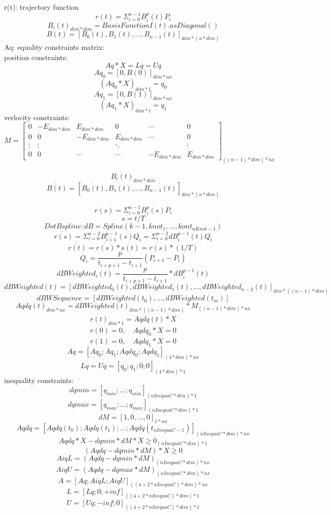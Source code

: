 \documentclass[]{article}
\begin{document}
    r(t): trajectory function \\
    \[ r(t) = \Sigma_{i = 0}^{n - 1}B_{i}^{p}(t)P_{i} \]
    \[B_{i}(t)_{dim * dim} =  BasisFunctionI(t).asDiagonal()\]
    \[B(t) = [B_{0}(t), B_{1}(t), \ldots, B_{n - 1}(t)]_{dim * (n * dim)} \]
    Aq: equality constraints matrix: \\
    position constraints:\\
    \[Aq * X = Lq = Uq \]
    \[ Aq_{0} = [0, B(0)]_{dim * nx} \]
    \[ (Aq_{0} * X)_{dim * 1} = q_{0} \]
    \[ Aq_{1} = [0, B(1)]_{dim * nx} \]
    \[ (Aq_{1} * X)_{dim * 1} = q_{1} \]
    verlocity constraints:\\
    \[ M = \begin{bmatrix}
        0 & -E_{dim * dim} & E_{dim * dim} & 0 & \cdots & 0 \\
        0 & 0 & -E_{dim * dim} & E_{dim * dim} & \cdots & 0 \\
        \vdots &  \vdots & & \ddots & & \vdots \\
        0 & 0 & \cdots &\cdots &-E_{dim * dim} & E_{dim * dim}
    \end{bmatrix}_{((n - 1) * dim) * nx} \]

    \[ \dot{B_i(t)}_{dim * dim}\]
    \[ \dot{B(t)} =  [\dot{B_{0}(t)}, \dot{B_{1}(t)}, \ldots, \dot{B_{n - 1}(t)}]_{dim * (n * dim)} \]
    
    \[ r(s) = \Sigma_{i = 0}^{n - 1}B_{i}^{p}(s)P_{i} \]
    \[ s = t/T \]
    \[ DotBspline: dB = Spline(k - 1, {knot_1,\dots, kont_{nKnot - 1}}) \]
    \[ \dot{r(s)} = \Sigma_{i = 0}^{n - 2}B_{i + 1}^{p - 1}(s)Q_{i} = \Sigma_{i = 0}^{n - 2}dB_{i}^{p - 1}(t)Q_{i} \]
    \[ \dot{r(t)} = \dot{r(s)} * \dot{s(t)} = \dot{r(s)} * (1/T) \]
    \[ Q_{i} = \frac{p}{t_{i + p + 1} - t_{i + 1}}(P_{i + 1} - P_{i}) \]
    \[ dBWeighted_{i}(t) = \frac{p}{t_{i + p + 1} - t_{i + 1}} * dB_{i}^{p - 1}(t) \]
    \[ dBWeighted(t) =  [dBWeighted_{0}(t), dBWeighted_{1}(t), \ldots, dBWeighted_{n - 2}(t)]_{dim * ((n - 1) * dim)} \]
    \[ dBWSequence = [dBWeighted(t_0), \dots, dBWeighted(t_m)] \]
    \[ Aqdq(t)_{dim * nx} = dBWeighted(t)_{dim * ((n - 1) * dim)} * M_{((n - 1) * dim) * nx} \]
    \[ \dot{r(t)}_{dim * 1} = Aqdq(t) * X \]
    \[ \dot{r(0)} = 0,\quad Aqdq_{0} * X = 0 \]
    \[ \dot{r(1)} = 0,\quad Aqdq_{1} * X = 0 \]
    \[ Aq = [Aq_{0}; Aq_{1}; Aqdq_{0}; Aqdq_{1}]_{(4 * dim) * nx} \]
    \[ Lq = Uq = [q_{0}; q_{1}; 0; 0]_{(4 * dim) * 1} \]
    inequality constraints: \\
    \[ dqmin = [\dot{q_{min}}; \ldots; \dot{q_{min}}]_{(nInequaC * dim) * 1} \]
    \[ dqmax = [\dot{q_{max}}; \ldots; \dot{q_{max}}]_{(nInequaC * dim) * 1} \]
    \[ dM = [1, 0, \ldots, 0]_{1 * nx} \]
    \[ Aqdq = [Aqdq(t_{0}); Aqdq(t_{1}); \ldots; Aqdq(t_{nInequaC - 1})]_{(nInequaC * dim) * nx} \]
    \[ Aqdq * X - dqmin * dM * X \geq 0_{(nInequaC * dim)*1} \]
    \[ (Aqdq - dqmin * dM) * X \geq 0 \]
    \[ AiqL = (Aqdq - dqmin * dM)_{(nInequaC * dim) * nx} \]
    \[ AiqU = (Aqdq - dqmax * dM)_{(nInequaC * dim) * nx} \]
    \[ A = [Aq; AiqL; AiqU]_{((4 + 2 * nInequaC) * dim) * nx}\]
    \[ L = [Lq; 0; +inf]_{((4 + 2 * nInequaC) * dim) * 1}\]
    \[ U = [Uq; -inf; 0]_{((4 + 2 * nInequaC) * dim) * 1}\]
\end{document}
